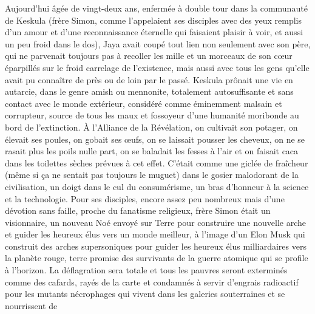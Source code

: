 Aujourd’hui âgée de vingt-deux ans, enfermée à double tour dans la communauté de Keskula (frère Simon, comme l’appelaient ses disciples avec des yeux remplis d’un amour et d’une reconnaissance éternelle qui faisaient plaisir à voir, et aussi un peu froid dans le dos), Jaya avait coupé tout lien non seulement avec son père, qui ne parvenait toujours pas à recoller les mille et un morceaux de son cœur éparpillés sur le froid carrelage de l’existence, mais aussi avec tous les gens qu’elle avait pu connaître de près ou de loin par le passé. Keskula prônait une vie en autarcie, dans le genre amish ou mennonite, totalement autosuffisante et sans contact avec le monde extérieur, considéré comme éminemment malsain et corrupteur, source de tous les maux et fossoyeur d’une humanité moribonde au bord de l’extinction. À l’Alliance de la Révélation, on cultivait son potager, on élevait ses poules, on gobait ses œufs, on se laissait pousser les cheveux, on ne se rasait plus les poils nulle part, on se baladait les fesses à l’air et on faisait caca dans les toilettes sèches prévues à cet effet. C’était comme une giclée de fraîcheur (même si ça ne sentait pas toujours le muguet) dans le gosier malodorant de la civilisation, un doigt dans le cul du consumérisme, un bras d’honneur à la science et la technologie. Pour ses disciples, encore assez peu nombreux mais d’une dévotion sans faille, proche du fanatisme religieux, frère Simon était un visionnaire, un nouveau Noé envoyé sur Terre pour construire une nouvelle arche et guider les heureux élus vers un monde meilleur, à l’image d’un Elon Musk qui construit des arches supersoniques pour guider les heureux élus milliardaires vers la planète rouge, terre promise des survivants de la guerre atomique qui se profile à l’horizon. La déflagration sera totale et tous les pauvres seront exterminés comme des cafards, rayés de la carte et condamnés à servir d’engrais radioactif pour les mutants nécrophages qui vivent dans les galeries souterraines et se nourrissent de%
\illusloflabel{}%
%

